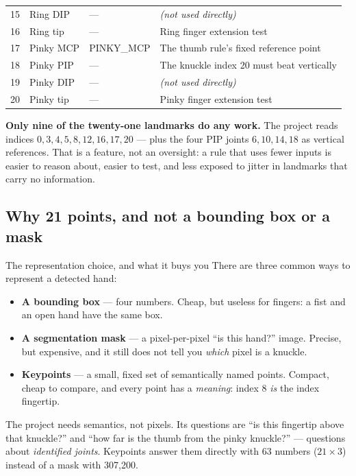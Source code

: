 \begin{center}
\begin{tabularx}{\textwidth}{@{}r l l X@{}}
15 & Ring DIP           & ---        & \textit{(not used directly)} \\
16 & Ring tip           & ---        & Ring finger extension test \\
17 & Pinky MCP          & PINKY\_MCP & The thumb rule's fixed reference point \\
18 & Pinky PIP          & ---        & The knuckle index 20 must beat vertically \\
19 & Pinky DIP          & ---        & \textit{(not used directly)} \\
20 & Pinky tip          & ---        & Pinky finger extension test \\
\bottomrule
\end{tabularx}
\end{center}

\begin{keyidea}
\textbf{Only nine of the twenty-one landmarks do any work.} The project reads indices
$0, 3, 4, 5, 8, 12, 16, 17, 20$ --- plus the four PIP joints $6, 10, 14, 18$ as vertical references.
That is a feature, not an oversight: a rule that uses fewer inputs is easier to reason about, easier
to test, and less exposed to jitter in landmarks that carry no information.
\end{keyidea}

\subsection{Why 21 points, and not a bounding box or a mask}

\begin{mlconcept}{The representation choice, and what it buys you}
There are three common ways to represent a detected hand:

\begin{itemize}
  \item \textbf{A bounding box} --- four numbers. Cheap, but useless for fingers: a fist and an open
        hand have the same box.
  \item \textbf{A segmentation mask} --- a pixel-per-pixel ``is this hand?'' image. Precise, but
        expensive, and it still does not tell you \emph{which} pixel is a knuckle.
  \item \textbf{Keypoints} --- a small, fixed set of semantically named points. Compact, cheap to
        compare, and every point has a \emph{meaning}: index 8 \emph{is} the index fingertip.
\end{itemize}

The project needs semantics, not pixels. Its questions are ``is this fingertip above that knuckle?''
and ``how far is the thumb from the pinky knuckle?'' --- questions about \emph{identified joints}.
Keypoints answer them directly with 63 numbers ($21 \times 3$) instead of a mask with 307{,}200.
\end{mlconcept}

